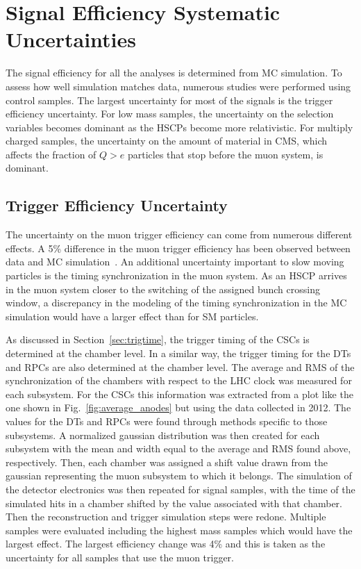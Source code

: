 \section{Signal Efficiency Systematic Uncertainties \label{sec:SystUnc}}

The signal efficiency for all the analyses is determined from MC simulation. To assess how well simulation matches data, numerous studies were performed using control samples.
The largest uncertainty for most of the signals is the trigger efficiency uncertainty. For low mass samples, the uncertainty on the selection variables becomes
dominant as the HSCPs become more relativistic. For multiply charged samples, the uncertainty on the amount of material in CMS, which affects the fraction of $Q>e$ particles
that stop before the muon system, is dominant.

\subsection{Trigger Efficiency Uncertainty}


The uncertainty on the muon trigger efficiency can come from numerous different effects. 
A 5\% difference in the muon trigger efficiency has been observed between data and MC simulation~\cite{2012JInst...7P0002T}.
An additional uncertainty important to slow moving particles is the timing synchronization in the muon system. As an HSCP arrives in the muon system
closer to the switching of the assigned bunch crossing window, a discrepancy in the modeling of the timing synchronization in the MC simulation
would have a larger effect than for SM particles.

As discussed in Section~\ref{sec:trigtime}, the trigger timing of the CSCs is determined at the chamber level. In a similar way,
the trigger timing for the DTs and RPCs are also determined at the chamber level.
The average and RMS of the synchronization of the chambers with respect to the LHC clock was measured for each subsystem.
For the CSCs this information was extracted from a plot like the one shown in Fig.~\ref{fig:average_anodes} but using the data collected in 2012.
The values for the DTs and RPCs were found through methods specific to those subsystems.
A normalized gaussian distribution was then created for each subsystem with the mean and width equal to the average and RMS found above, respectively.
Then, each chamber was assigned a shift value drawn from the gaussian representing the muon subsystem to which it belongs.
The simulation of the detector electronics was then repeated for signal samples, with
the time of the simulated hits in a chamber shifted by the value associated with that chamber. Then the reconstruction and trigger
simulation steps were redone. 
Multiple samples were evaluated including the highest mass samples which would have the largest effect.
The largest efficiency change was 4\% and this is taken as the uncertainty for all samples that use the muon trigger.

